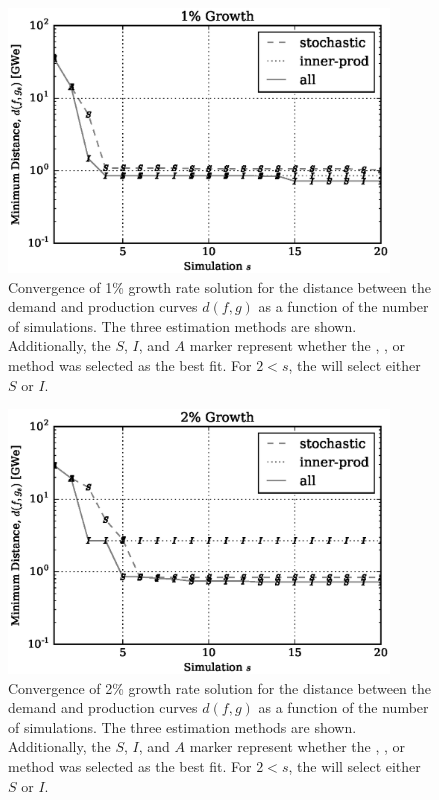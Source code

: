 \begin{figure}[htb]
\centering
\includegraphics[width=0.9\textwidth]{converge-1per.eps}
\caption{Convergence of 1\% growth rate solution for the distance between
the demand and production curves $d(f, g)$ as a function of the number of
simulations. The three estimation methods are shown. Additionally, the
$S$, $I$, and $A$ marker represent whether the \stochastic, \innerprod,
or \allflag method was selected as the best fit. For $2 < s$, the \allflag
will select either $S$ or $I$.
}
\label{converge-1per}
\end{figure}

\begin{figure}[htb]
\centering
\includegraphics[width=0.9\textwidth]{converge-2per.eps}
\caption{Convergence of 2\% growth rate solution for the distance between
the demand and production curves $d(f, g)$ as a function of the number of
simulations. The three estimation methods are shown. Additionally, the
$S$, $I$, and $A$ marker represent whether the \stochastic, \innerprod,
or \allflag method was selected as the best fit. For $2 < s$, the \allflag
will select either $S$ or $I$.
}
\label{converge-2per}
\end{figure}

